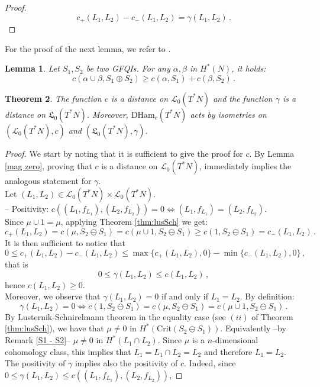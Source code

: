 \documentclass{article}
\newcommand{\1}{\mathbbm{1}}
\newtheorem{thm}{Theorem}[section]
\newtheorem{lem}[thm]{Lemma}
\theoremstyle{remark}
\begin{document}
{{\begin{proof}
$$c_+(L_1,L_2) - c_-(L_1,L_2) = \gamma(L_1,L_2)\, .$$
\end{proof}
\noindent For the proof of the next lemma, we refer to \cite[Proposition 3.3]{vit92}.
\begin{lem} \label{triangle}
Let $S_1, S_2$ be two GFQIs. For any $\alpha, \beta$ in $H^*(N)$, it holds:
\begin{equation*}
c(\alpha\cup\beta, S_1 \oplus S_2) \geq c(\alpha, S_1) +c (\beta, S_2)\, .
    \end{equation*}
\end{lem}
\begin{thm} \label{distanze}
The function $c$ is a distance on $\mathscr{L}_0(T^*N)$ and the function $\gamma$ is a distance on $\mathfrak{L}_0(T^*N)$. Moreover, $\mathrm{DHam}_c(T^*N)$ acts by isometries on $(\mathscr{L}_0(T^*N),c)$ and $(\mathfrak{L}_0(T^*N),\gamma)$.
\end{thm}
\begin{proof} We start by noting that it is sufficient to give the proof for $c$. By Lemma \ref{mag zero}, proving that $c$ is a distance on $\mathscr{L}_0(T^*N)$, immediately implies the analogous statement for $\gamma$. \\
Let $(L_1,L_2) \in \mathscr{L}_0(T^*N) \times  \mathscr{L}_0(T^*N)$. \\
-- Positivity: $c((L_1, f_{L_1}) , (L_2, f_{L_2})) = 0 \Leftrightarrow (L_1, f_{L_1}) = (L_2, f_{L_2})$. \\
Since $\mu \cup 1 = \mu$, applying Theorem \ref{thm:lusSch} we get:
$$c_+(L_1,L_2) = c(\mu,S_2 \ominus S_1) = c(\mu \cup 1,S_2 \ominus S_1) \ge c(1,S_2 \ominus S_1) = c_-(L_1,L_2)\, .$$
It is then sufficient to notice that
$$0 \le c_+(L_1,L_2) - c_-(L_1,L_2) \le \max \{ c_+(L_1,L_2),0\} - \min \{c_-(L_1,L_2),0\}\, ,$$
that is
$$0 \le \gamma(L_1,L_2) \le c(L_1,L_2)\, ,$$
hence $c(L_1,L_2) \ge 0$. \\
Moreover, we observe that $\gamma(L_1,L_2) = 0$ if and only if $L_1 = L_2$. By definition:
$$\gamma(L_1,L_2) = 0 \Leftrightarrow c(1, S_2 \ominus S_1) = c(\mu, S_2 \ominus S_1) = c(\mu \cup 1, S_2 \ominus S_1)\, .$$
By Lusternik-Schnirelmann theorem in the equality case (see $(ii)$ of Theorem \ref{thm:lusSch}), we have that $\mu \ne 0$ in $H^*(\text{Crit}(S_2 \ominus S_1))$. Equivalently --by Remark \ref{S1 - S2}-- $\mu \ne 0$ in $H^*(L_1 \cap L_2)$. Since $\mu$ is a $n$-dimensional cohomology class, this implies that $L_1 = L_1 \cap L_2 = L_2$ and therefore $L_1 = L_2$. The positivity of $\gamma$ implies also the positivity of $c$. Indeed, since $0 \le \gamma(L_1,L_2) \le c((L_1, f_{L_1}),(L_2, f_{L_2}))$, 

\end{proof}}}
\end{document}
